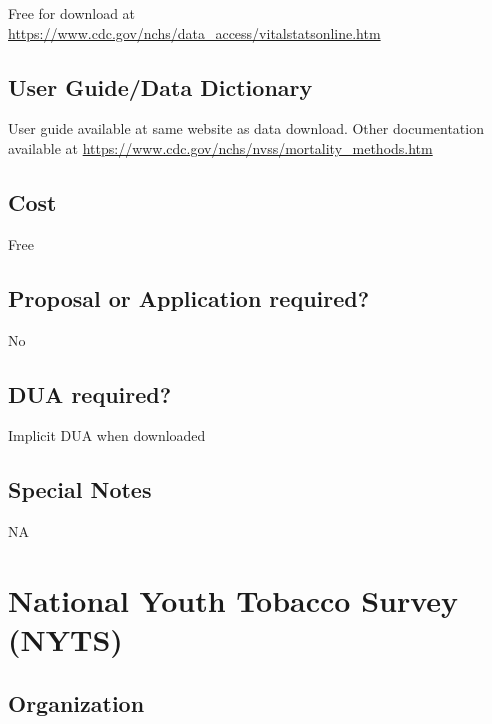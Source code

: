 \documentclass[
]{book}
\begin{document}
Free for download at \url{https://www.cdc.gov/nchs/data_access/vitalstatsonline.htm}

\hypertarget{user-guidedata-dictionary-67}{%
\section{User Guide/Data Dictionary}\label{user-guidedata-dictionary-67}}

User guide available at same website as data download. Other documentation available at \url{https://www.cdc.gov/nchs/nvss/mortality_methods.htm}

\hypertarget{cost-67}{%
\section{Cost}\label{cost-67}}

Free

\hypertarget{proposal-or-application-required-67}{%
\section{Proposal or Application required?}\label{proposal-or-application-required-67}}

No

\hypertarget{dua-required-67}{%
\section{DUA required?}\label{dua-required-67}}

Implicit DUA when downloaded

\hypertarget{special-notes-67}{%
\section{Special Notes}\label{special-notes-67}}

NA

\mainmatter

\hypertarget{national-youth-tobacco-survey-nyts}{%
\chapter{National Youth Tobacco Survey (NYTS)}\label{national-youth-tobacco-survey-nyts}}

\hypertarget{organization-68}{%
\section{Organization}\label{organization-68}}
\end{document}
